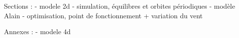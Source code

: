 Sections :
- modele 2d
- simulation, équilibres et orbites périodiques
- modèle Alain
- optimisation, point de fonctionnement + variation du vent

Annexes :
 - modele 4d